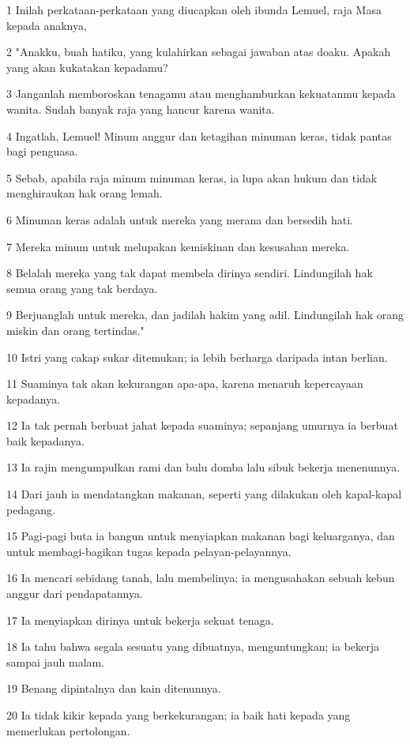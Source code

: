 \par 1 Inilah perkataan-perkataan yang diucapkan oleh ibunda Lemuel, raja Masa kepada anaknya,
\par 2 "Anakku, buah hatiku, yang kulahirkan sebagai jawaban atas doaku. Apakah yang akan kukatakan kepadamu?
\par 3 Janganlah memboroskan tenagamu atau menghamburkan kekuatanmu kepada wanita. Sudah banyak raja yang hancur karena wanita.
\par 4 Ingatlah, Lemuel! Minum anggur dan ketagihan minuman keras, tidak pantas bagi penguasa.
\par 5 Sebab, apabila raja minum minuman keras, ia lupa akan hukum dan tidak menghiraukan hak orang lemah.
\par 6 Minuman keras adalah untuk mereka yang merana dan bersedih hati.
\par 7 Mereka minum untuk melupakan kemiskinan dan kesusahan mereka.
\par 8 Belalah mereka yang tak dapat membela dirinya sendiri. Lindungilah hak semua orang yang tak berdaya.
\par 9 Berjuanglah untuk mereka, dan jadilah hakim yang adil. Lindungilah hak orang miskin dan orang tertindas."
\par 10 Istri yang cakap sukar ditemukan; ia lebih berharga daripada intan berlian.
\par 11 Suaminya tak akan kekurangan apa-apa, karena menaruh kepercayaan kepadanya.
\par 12 Ia tak pernah berbuat jahat kepada suaminya; sepanjang umurnya ia berbuat baik kepadanya.
\par 13 Ia rajin mengumpulkan rami dan bulu domba lalu sibuk bekerja menenunnya.
\par 14 Dari jauh ia mendatangkan makanan, seperti yang dilakukan oleh kapal-kapal pedagang.
\par 15 Pagi-pagi buta ia bangun untuk menyiapkan makanan bagi keluarganya, dan untuk membagi-bagikan tugas kepada pelayan-pelayannya.
\par 16 Ia mencari sebidang tanah, lalu membelinya; ia mengusahakan sebuah kebun anggur dari pendapatannya.
\par 17 Ia menyiapkan dirinya untuk bekerja sekuat tenaga.
\par 18 Ia tahu bahwa segala sesuatu yang dibuatnya, menguntungkan; ia bekerja sampai jauh malam.
\par 19 Benang dipintalnya dan kain ditenunnya.
\par 20 Ia tidak kikir kepada yang berkekurangan; ia baik hati kepada yang memerlukan pertolongan.
